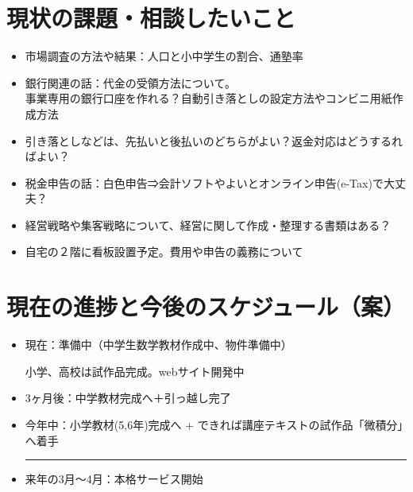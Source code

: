 ﻿\documentclass[12pt]{article}
\begin{document}
\section{現状の課題・相談したいこと}
\begin{itemize}[leftmargin=1.5em]
  \item 市場調査の方法や結果：人口と小中学生の割合、通塾率
  \item 銀行関連の話：代金の受領方法について。\\
  事業専用の銀行口座を作れる？自動引き落としの設定方法やコンビニ用紙作成方法
  \item 引き落としなどは、先払いと後払いのどちらがよい？返金対応はどうするればよい？
  \item 税金申告の話：白色申告⇒会計ソフトやよいとオンライン申告(e-Tax)で大丈夫？
  \item 経営戦略や集客戦略について、経営に関して作成・整理する書類はある？
  \item 自宅の２階に看板設置予定。費用や申告の義務について
\end{itemize}


\section{現在の進捗と今後のスケジュール（案）}
\begin{itemize}[leftmargin=1.5em, parsep=4pt]
  \item 現在：準備中（中学生数学教材作成中、物件準備中）
    
  小学、高校は試作品完成。webサイト開発中
  
  \item 3ヶ月後：中学教材完成へ＋引っ越し完了
  \item 今年中：小学教材(5,6年)完成へ + できれば講座テキストの試作品「微積分」へ着手
  
  \vspace{4mm} \hrule height 1.5pt \vspace{3mm}
  
  \item 来年の3月～4月：本格サービス開始
\end{itemize}

\end{document}
